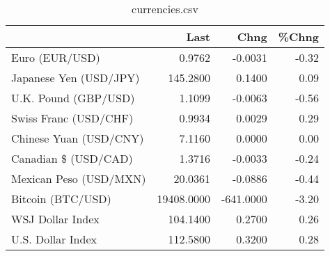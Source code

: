 \documentclass{article}%
\begin{document}
%


\begin{table}[htbp]%
\caption{currencies.csv}%
\centering%
\begin{adjustbox}{width=1\textwidth}%
\begin{tabular}{lrrr}
\toprule
                       &       Last &      Chng &  \%Chng \\
\midrule
        Euro (EUR/USD) &     0.9762 &   -0.0031 &  -0.32 \\
Japanese Yen (USD/JPY) &   145.2800 &    0.1400 &   0.09 \\
  U.K. Pound (GBP/USD) &     1.1099 &   -0.0063 &  -0.56 \\
 Swiss Franc (USD/CHF) &     0.9934 &    0.0029 &   0.29 \\
Chinese Yuan (USD/CNY) &     7.1160 &    0.0000 &   0.00 \\
  Canadian \$ (USD/CAD) &     1.3716 &   -0.0033 &  -0.24 \\
Mexican Peso (USD/MXN) &    20.0361 &   -0.0886 &  -0.44 \\
     Bitcoin (BTC/USD) & 19408.0000 & -641.0000 &  -3.20 \\
      WSJ Dollar Index &   104.1400 &    0.2700 &   0.26 \\
     U.S. Dollar Index &   112.5800 &    0.3200 &   0.28 \\
\bottomrule
\end{tabular}
%
\end{adjustbox}%
\end{table}

%
\end{document}
